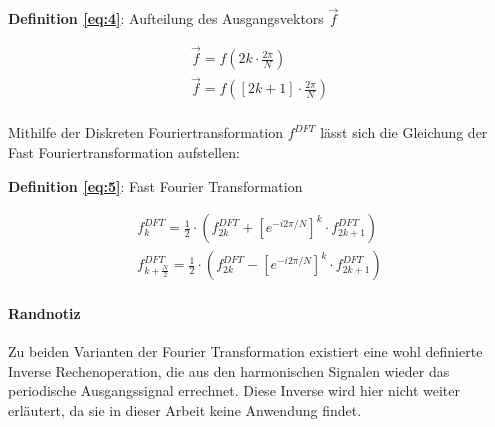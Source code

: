 \begin{flushleft}
	\textbf{Definition \eqref{eq:4}}: Aufteilung des Ausgangsvektors $\vec{f}$
\end{flushleft}
\vspace{\baselineskip}
\begin{equation}
	\begin{gathered}
		\vec{f} = f(2k \cdot \frac{2\pi}{N}) \\
		\vec{f} = f( \left[ 2k+1\right]  \cdot \frac{2\pi}{N}) \\
	\end{gathered}\label{eq:4}
\end{equation}

Mithilfe der Diskreten Fouriertransformation $f^{DFT}$ lässt sich die Gleichung der Fast Fouriertransformation aufstellen:

\begin{flushleft}
	\textbf{Definition \eqref{eq:5}}: Fast Fourier Transformation \cite{arenz_fourier}
\end{flushleft}
\vspace{\baselineskip}
\begin{equation}
	\begin{gathered}
		{f}_{k}^{DFT} = \frac{1}{2} \cdot ({f}_{2k}^{DFT} + \left[ e^{-i 2 \pi / N}\right] ^{k} \cdot {f}_{2k+1}^{DFT}) \\
		{f}_{k+\frac{N}{2}}^{DFT} = \frac{1}{2} \cdot ({f}_{2k}^{DFT} - \left[ e^{-i 2 \pi / N}\right] ^{k} \cdot {f}_{2k+1}^{DFT})
	\end{gathered}\label{eq:5}
\end{equation}



\paragraph{Randnotiz}
Zu beiden Varianten der Fourier Transformation existiert eine wohl definierte Inverse Rechenoperation, die aus den harmonischen Signalen wieder das periodische Ausgangssignal errechnet. Diese Inverse wird hier nicht weiter erläutert, da sie in dieser Arbeit keine Anwendung findet.